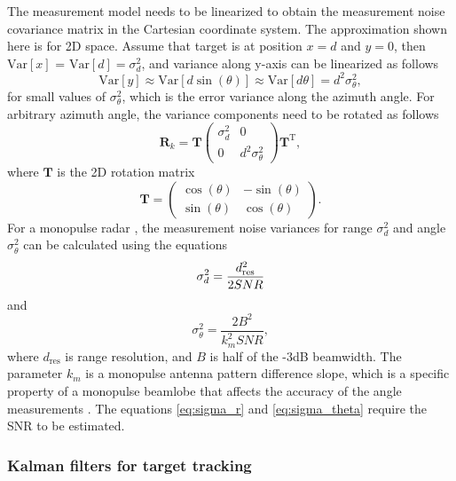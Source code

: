 \documentclass[english, 12pt, a4paper, elec, utf8, a-1b, online]{aaltothesis}
\numberwithin{equation}{section}
\renewcommand{\vec}[1]{\mathbf{#1}}
\newcommand{\ocov}{\vec{R}_k}
\newcommand{\transpose}[1]{#1^\text{T}}
\newcommand{\rotmat}{\mathbf{T}}
\newcommand{\Var}[1]{\text{Var}\left[ #1 \right]}
\begin{document}
The measurement model needs to be linearized to obtain the measurement noise covariance matrix in the Cartesian coordinate system.
The approximation shown here is for 2D space.
Assume that target is at position $x=d$ and $y=0$, then $\Var{x}$ = $\Var{d} = \sigma_d^2$, and variance along y-axis can be linearized as follows
\begin{equation*}
    \Var{y} \approx \Var{d \sin\left(\theta\right)} \approx \Var{d \theta} = d^2\sigma_\theta^2,
\end{equation*} 
for small values of $\sigma_\theta^2$, which is the error variance along the azimuth angle.
For arbitrary azimuth angle, the variance components need to be rotated as follows
\begin{equation} \label{eq:cartesian_measurement_covariance}
    \ocov = \rotmat 
    \begin{pmatrix}
            \sigma_d^2 & 0 \\
            0 & d^2 \sigma_\theta^2
    \end{pmatrix}
    \transpose{\rotmat},
\end{equation}
where $\rotmat$ is the 2D rotation matrix
\begin{equation}
    \rotmat = 
    \begin{pmatrix}
            \cos(\theta) & -\sin(\theta) \\
            \sin(\theta) & \cos(\theta)
    \end{pmatrix}.
\end{equation}
For a monopulse radar \cite{Sherman2011}, the measurement noise variances for range $\sigma_d^2$ and angle $\sigma_\theta^2$ can be calculated using the equations \cite{Curry2011}
\begin{equation}
    \sigma_d^2 =  \frac{d_\text{res}^2}{2 SNR}  \label{eq:sigma_r}\\
\end{equation}
and
\begin{equation}
    \sigma_\theta^2 =  \frac{2 B^2}{k_m^2 SNR} \label{eq:sigma_theta},
\end{equation}
where $d_\text{res}$ is range resolution, and $B$ is half of the -3dB beamwidth. 
The parameter $k_m$ is a monopulse antenna pattern difference slope, which is a specific property of a monopulse beamlobe that affects the accuracy of the angle measurements \cite{Sherman2011}.
The equations \eqref{eq:sigma_r} and \eqref{eq:sigma_theta} require the SNR to be estimated.

\subsubsection{Kalman filters for target tracking} \label{sec:kalman_filter}
\end{document}
